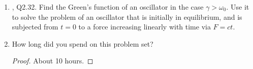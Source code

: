 \documentclass[../psets.tex]{subfiles}
\begin{document}
\begin{enumerate}
\begin{enumerate}
\begin{proof}
        \end{proof}
    \end{enumerate}
    \item \textcite{bib:KibbleBerkshire}, Q2.32. Find the Green's function of an oscillator in the case $\gamma>\omega_0$. Use it to solve the problem of an oscillator that is initially in equilibrium, and is subjected from $t=0$ to a force increasing linearly with time via $F=ct$.
    \item How long did you spend on this problem set?
    \begin{proof}
        About 10 hours.
    \end{proof}
\end{enumerate}
\end{document}
